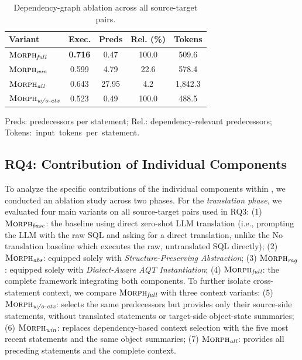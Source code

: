 \documentclass[conference]{IEEEtran}
\begin{document}
\begin{table}[!t]
\centering
\footnotesize
\caption{Dependency-graph ablation across all source-target pairs.}
\label{tab:ablation_depgraph}
\setlength{\tabcolsep}{3pt}
\begin{tabular*}{\columnwidth}{@{\extracolsep{\fill}}lcccc@{}}
\toprule
\textbf{Variant} & \textbf{Exec.} & \textbf{Preds} & \textbf{Rel. (\%)} & \textbf{Tokens} \\
\midrule
$\textsc{Morph}{}_{\textit{full}}$    & \textbf{0.716} & 0.47  & 100.0 & 509.6 \\
$\textsc{Morph}{}_{\textit{win}}$     & 0.599 & 4.79  & 22.6  & 578.4 \\
$\textsc{Morph}{}_{\textit{all}}$     & 0.643 & 27.95 & 4.2   & 1,842.3 \\
$\textsc{Morph}{}_{\textit{w/o-ctx}}$ & 0.523 & 0.49  & 100.0 & 488.5 \\
\bottomrule
\end{tabular*}
\par\smallskip
\parbox{\columnwidth}{\scriptsize\raggedright
Preds: predecessors per statement; Rel.: dependency-relevant predecessors; \mbox{Tokens: input tokens per statement.}}
\end{table}

\subsection{RQ4: Contribution of Individual Components}
To analyze the specific contributions of the individual components within \tool{}, we conducted an ablation study across two phases. 
For the \textit{translation phase}, we evaluated four main variants on all source-target pairs used in RQ3:
(1) $\textsc{Morph}{}_{\textit{base}}$: the baseline using direct zero-shot LLM translation (i.e., prompting the LLM with the raw SQL and asking for a direct translation, unlike the No translation baseline which executes the raw, untranslated SQL directly);
(2) $\textsc{Morph}{}_{\textit{abs}}$: equipped solely with \textit{Structure-Preserving Abstraction};
(3) $\textsc{Morph}{}_{\textit{rag}}$: equipped solely with \textit{Dialect-Aware AQT Instantiation};
(4) $\textsc{Morph}{}_{\textit{full}}$: the complete framework integrating both components.
To further isolate cross-statement context, we compare $\textsc{Morph}{}_{\textit{full}}$ with three context variants:
(5) $\textsc{Morph}{}_{\textit{w/o-ctx}}$: selects the same predecessors but provides only their source-side statements, without translated statements or target-side object-state summaries;
(6) $\textsc{Morph}{}_{\textit{win}}$: replaces dependency-based context selection with the five most recent statements and the same object summaries;
(7) $\textsc{Morph}{}_{\textit{all}}$: provides all preceding statements and the complete context.
\end{document}
